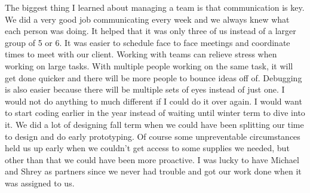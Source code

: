 \documentclass[letterpaper,10pt,draftclsnofoot,onecolumn]{article}
\begin{document}
\newline
\newline
The biggest thing I learned about managing a team is that communication is key. We did a very good job communicating every week and we always knew what each person was doing. It helped that it was only three of us instead of a larger group of 5 or 6. It was easier to schedule face to face meetings and coordinate times to meet with our client.
\newline
\newline
Working with teams can relieve stress when working on large tasks. With multiple people working on the same task, it will get done quicker and there will be more people to bounce ideas off of. Debugging is also easier because there will be multiple sets of eyes instead of just one.
\newline
\newline
I would not do anything to much different if I could do it over again. I would want to start coding earlier in the year instead of waiting until winter term to dive into it. We did a lot of designing fall term when we could have been splitting our time to design and do early prototyping. Of course some unpreventable circumstances held us up early when we couldn't get access to some supplies we needed, but other than that we could have been more proactive. I was lucky to have Michael and Shrey as partners since we never had trouble and got our work done when it was assigned to us.
\end{document}
